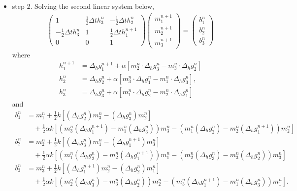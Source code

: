 \documentclass[preprint,times,3p]{elsarticle}
\begin{document}
\begin{itemize}
\begin{align*}
b_3^n&=m_3^n+\frac12 k [(\Delta_h g_1^{n})m_2^n-(\Delta_h g_2^{n})m_1^n]\\
&\quad+\frac12 \alpha k [(m_2^n(\Delta_h g_3^{n})-m_3^n(\Delta_h g_2^{n}))m_2^n-(m_3^n(\Delta_h g_1^{n})-m_1^n(\Delta_h g_3^{n}))m_1^n].
\end{align*}
    \item step 2. Solving the second linear system below,
	\begin{align*}
	\begin{pmatrix}
	1&\frac12 \Delta t h_3^n&-\frac12 \Delta t h_2^n\\
	-\frac12 \Delta th_3^n&1&\frac12 \Delta th_1^{n+1}\\
	0&0&1
	\end{pmatrix}\begin{pmatrix}
	m_1^{n+1}\\
	m_2^{n+1}\\
	m_3^{n+1}
	\end{pmatrix}=\begin{pmatrix}
	b_1^n\\
	b_2^n\\
	b_3^n
	\end{pmatrix}
	\end{align*}
        where 
    \begin{align*}
h_1^{n+1}&=\Delta_h g_1^{n+1}+\alpha \left[m_2^n \cdot \Delta_hg_3^{n}-m_3^n\cdot \Delta_h g_2^{n}\right]\\
h_2^n&=\Delta_h g_2^{n}+\alpha \left[m_3^n \cdot \Delta_hg_1^{n}-m_1^n\cdot \Delta_h g_3^{n}\right],\\
	h_3^n&=\Delta_h g_3^{n}+\alpha \left[m_1^n \cdot \Delta_hg_2^{n}-m_2^n\cdot \Delta_h g_1^{n}\right]
\end{align*}
and 
\begin{align*}
b_1^n&=m_1^n+\frac12 k [( \Delta_h g_2^{n})m_3^n-( \Delta_h g_3^{n})m_2^n]\\
&\quad+\frac12 \alpha k [(m_3^n(\Delta_h g_1^{n+1})-m_1^n(\Delta_h g_3^{n}))m_3^n-(m_1^n(\Delta_h g_2^{n})-m_2^n(\Delta_h g_1^{n+1}))m_2^n]\\
b_2^n&=m_2^n+\frac12 k [(\Delta_h g_3^{n})m_1^n-(\Delta_h g_1^{n+1})m_3^n]\\
&\quad+\frac12 \alpha k [(m_1^n(\Delta_h g_2^{n})-m_2^n(\Delta_h g_1^{n+1}))m_1^n-(m_2^n(\Delta_h g_3^{n})-m_3^n(\Delta_h g_2^{n}))m_3^n]\\
b_3^n&=m_3^n+\frac12 k [(\Delta_h g_1^{n+1})m_2^n-(\Delta_h g_2^{n})m_1^n]\\
&\quad+\frac12 \alpha k [(m_2^n(\Delta_h g_3^{n})-m_3^n(\Delta_h g_2^{n}))m_2^n-(m_3^n(\Delta_h g_1^{n+1})-m_1^n(\Delta_h g_3^{n}))m_1^n].

\end{align*}
\end{itemize}
\end{document}
